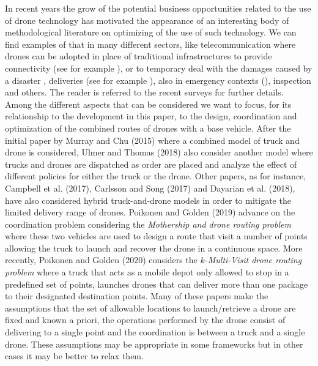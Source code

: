 \documentclass{itor}
\theoremstyle{definition}
\theoremstyle{remark}
\begin{document}
In recent years the grow of the potential business opportunities related to the use of drone technology has motivated the appearance of an interesting body of methodological literature on optimizing of the use of such technology. 
We can find examples of that in many different sectors, like telecommunication where drones can be adopted in place of traditional infrastructures to provide connectivity (see for example \cite{art:Amorosi2018,art:Chiaraviglio2018,Jimenez2018,art:Amorosi2019,art:Chiaraviglio2019a}), or to temporary deal with the damages caused by a disaster \citep{art:Chiaraviglio2019}, deliveries (see for example \cite{art:Mathew2015, art:Ferrandez2016, art:Poikonen2020, art:Amorosi2020}), also in emergency contexts (\cite{art:Wen2016}), inspection \citep{art:Trotta2018} and others.
The reader is referred to the recent surveys \cite{art:Otto2018,  art:Chung2020, art:Rojas2020} for further details.\\
\noindent
Among the different aspects that can be considered we want to focus, for its relationship to the development in this paper, to the design, coordination and optimization of the combined routes of drones with a base vehicle. After the initial paper by Murray and Chu (2015) where a combined model of truck and drone is considered, Ulmer and Thomas (2018) also consider another model where trucks and drones are dispatched as order are placed and analyze the effect of different policies for either the truck or the drone. Other papers, as for instance, Campbell et al. (2017), Carlsson and Song (2017) and Dayarian et al. (2018), have also considered hybrid truck-and-drone models in order to mitigate the limited delivery range of drones. Poikonen and Golden (2019) advance on the coordination problem considering the \textit{Mothership and drone routing problem} where these two vehicles are used to design a route that visit a number of points allowing the truck to launch and recover the drone in a continuous space. More recently,  Poikonen and Golden (2020) considers the \textit{$k$-Multi-Visit drone routing problem} where a truck that acts as a mobile depot only allowed to stop in a predefined set of points, launches drones that can deliver more than one package to their designated destination points.
\noindent
Many of these papers make the assumptions that the set of allowable locations to launch/retrieve a drone are fixed and known a priori, the operations performed by the drone consist of delivering to a single point and the coordination is between a truck and a single drone. These assumptions may be appropriate in some frameworks but in other cases it may be better to relax them.\\
\end{document}
